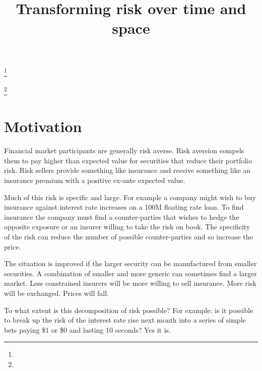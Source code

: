 \documentclass{tran-l}
\theoremstyle{definition}
\theoremstyle{remark}
\numberwithin{equation}{subsection}
\begin{document}
\title[]
{Transforming risk over time and space}

\author{}

\address{}

\email{}

\thanks{}

\thanks{}

\subjclass{}

\keywords{}

\date{}

\dedicatory{}

\commby{}



\maketitle


\section*{Motivation}

Financial market participants are generally risk averse. Risk aversion compels them to pay higher than expected value for securities that reduce their portfolio risk. Risk sellers provide something like insurance and receive something like an insurance premium with a positive ex-ante expected value.

Much of this risk is specific and large. For example a company might wish to buy insurance against interest rate increases on a 100M floating rate loan. To find insurance the company must find a counter-parties that wishes to hedge the opposite exposure or an insurer willing to take the risk on book. The specificity of the risk can reduce the number of possible counter-parties and so increase the price.

The situation is improved if the larger security can be manufactured from smaller securities. A combination of smaller and more generic can sometimes find a larger market. Less constrained insurers will be more willing to sell insurance. More risk will be exchanged. Prices will fall.

To what extent is this decomposition of risk possible? For example: is it  possible to break up the risk of the interest rate rise next month into a series of simple bets paying \$1 or \$0 and lasting 10 seconds? Yes it is.
\end{document}
